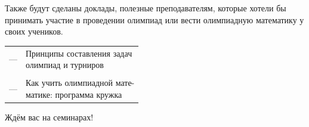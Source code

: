 \documentclass[a4paper,17pt]{extarticle}
\begin{document}
Также будут сделаны доклады, полезные преподавателям, которые хотели бы принимать участие в проведении олимпиад или вести олимпиадную математику у своих учеников.\vspace{-3mm}

\begin{center} \begin{tabular}{ll}
	—%
		\phantom{проб} &
		\makecell[l]{Принципы составления задач \\ олимпиад и турниров} \\
	\vspace{-4mm} \\
	—%
		\phantom{проб} &
		\makecell[l]{Как учить олимпиадной мате- \\ матике: программа кружка}
\end{tabular} \end{center}


\begin{center}
	Ждём вас на семинарах!%
\end{center}

\clearpage
\end{document}
